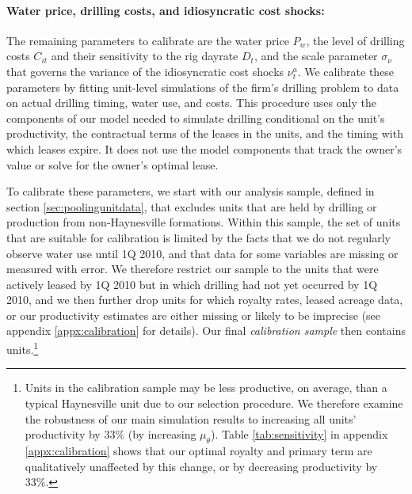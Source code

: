 \documentclass[12pt]{article}
\begin{document}
\paragraph{Water price, drilling costs, and idiosyncratic cost shocks:}

The remaining parameters to calibrate are the water price $P_w$, the level of drilling costs $C_{it}$ and their sensitivity to the rig dayrate $D_t$, and the scale parameter $\sigma_\nu$ that governs the variance of the idiosyncratic cost shocks $\nu^a_t$. We calibrate these parameters by fitting unit-level simulations of the firm's drilling problem to data on actual drilling timing, water use, and costs. This procedure uses only the components of our model needed to simulate drilling conditional on the unit's productivity, the contractual terms of the leases in the units, and the timing with which leases expire. It does not use the model components that track the owner's value or solve for the owner's optimal lease.

To calibrate these parameters, we start with our analysis sample, defined in section \ref{sec:poolingunitdata}, that excludes units that are held by drilling or production from non-Haynesville formations. Within this sample, the set of units that are suitable for calibration is limited by the facts that we do not regularly observe water use until 1Q 2010, and that data for some variables are missing or measured with error. We therefore restrict our sample to the units that were actively leased by 1Q 2010 but in which drilling had not yet occurred by 1Q 2010, and we then further drop units for which royalty rates, leased acreage data, or our productivity estimates are either missing or likely to be imprecise (see appendix \ref{appx:calibration} for details). Our final {\it calibration sample} then contains units.\footnote{Units in the calibration sample may be less productive, on average, than a typical Haynesville unit due to our selection procedure. We therefore examine the robustness of our main simulation results to increasing all units' productivity by 33\% (by increasing $\mu_\theta$). Table \ref{tab:sensitivity} in appendix \ref{appx:calibration} shows that our optimal royalty and primary term are qualitatively unaffected by this change, or by decreasing productivity by 33\%.}
\end{document}
